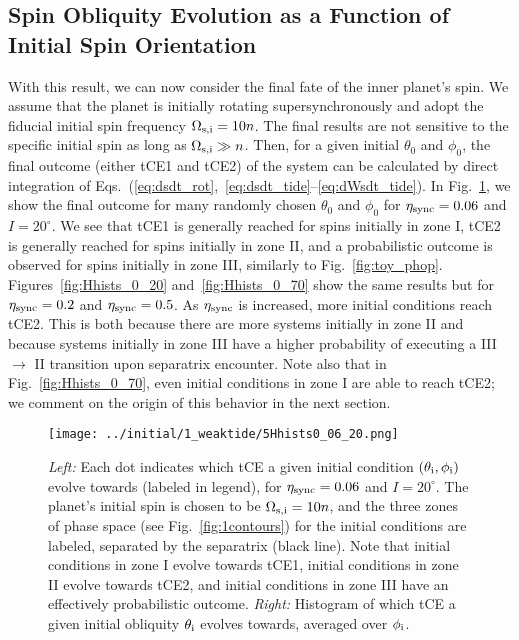 \documentclass[
        fleqn,
        usenatbib,
    ]{mnras}
\begin{document}
\subsection{Spin Obliquity Evolution as a Function of Initial Spin Orientation}

With this result, we can now consider the final fate of the inner planet's spin.
We assume that the planet is initially rotating supersynchronously and adopt the
fiducial initial spin frequency $\Omega_{\rm s, i} = 10n$. The final results are
not sensitive to the specific initial spin as long as $\Omega_{\rm s, i} \gg n$.
Then, for a given initial $\theta_0$ and $\phi_0$, the final outcome (either
tCE1 and tCE2) of the system can be calculated by direct integration of
Eqs.~(\ref{eq:dsdt_rot},~\ref{eq:dsdt_tide}--\ref{eq:dWsdt_tide}). In
Fig.~\ref{fig:Hhists_0_06}, we show the final outcome for many randomly chosen
$\theta_0$ and $\phi_0$ for $\eta_{\rm sync} = 0.06$ and $I = 20^\circ$. We see
that tCE1 is generally reached for spins initially in zone I, tCE2 is generally
reached for spins initially in zone II, and a probabilistic outcome is observed
for spins initially in zone III, similarly to Fig.~\ref{fig:toy_phop}.
Figures~\ref{fig:Hhists_0_20} and~\ref{fig:Hhists_0_70} show the same results
but for $\eta_{\rm sync} = 0.2$ and $\eta_{\rm sync} = 0.5$. As $\eta_{\rm
sync}$ is increased, more initial conditions reach tCE2. This is both because
there are more systems initially in zone II and because systems initially
in zone III have a higher probability of executing a III $\to$ II transition
upon separatrix encounter. Note also that in Fig.~\ref{fig:Hhists_0_70}, even
initial conditions in zone I are able to reach tCE2; we comment on the origin of
this behavior in the next section.
\begin{figure}
    \centering
    \texttt{[image: ../initial/1\_weaktide/5Hhists0\_06\_20.png]}
    \caption{\emph{Left:} Each dot indicates which tCE a given initial condition
    $(\theta_{\rm i}, \phi_{\rm i})$ evolve towards (labeled in legend), for
    $\eta_{\rm sync} = 0.06$ and $I = 20^\circ$. The planet's initial spin is
    chosen to be $\Omega_{\rm s, i} = 10n$, and the three zones of phase space
    (see Fig.~\ref{fig:1contours}) for the initial conditions are labeled,
    separated by the separatrix (black line). Note that initial conditions in
    zone I evolve towards tCE1, initial conditions in zone II evolve towards
    tCE2, and initial conditions in zone III have an effectively probabilistic
    outcome. \emph{Right:} Histogram of which tCE a given initial obliquity
    $\theta_{\rm i}$ evolves towards, averaged over $\phi_{\rm
    i}$.}\label{fig:Hhists_0_06}
\end{figure}
\end{document}
